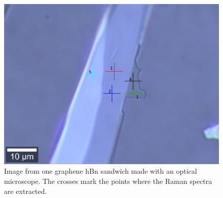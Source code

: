 \documentclass[12pt,a4paper]{article}
\begin{document}
\begin{figure}
\centering
\includegraphics[scale=0.25]{Bilder/Part_2/4_Half_sandwich_on_PMMA.PNG}
\caption{Image from one graphene hBn sandwich made with an optical microscope. The crosses mark the points where the Raman spectra are extracted.}
\label{fig:Part2_map_microscope}
\end{figure}

\end{document}
